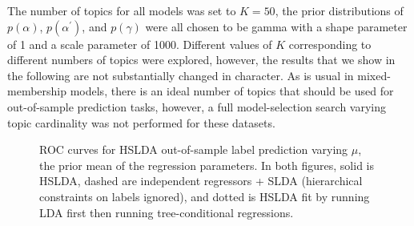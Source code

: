 The number of topics for all models was set to $K=50$, the prior distributions of
$p\left(\alpha\right)$, $p\left(\alpha^{\prime}\right)$, and
$p\left(\gamma\right)$ were all chosen to be gamma with a shape parameter of 1 and a
scale parameter of 1000.   Different values of $K$ corresponding to different numbers of topics were explored, however, the results that we show in the following are not substantially changed in character.  As is usual in mixed-membership models, there is an ideal number of topics that should be used for out-of-sample prediction tasks, however, a full model-selection search varying topic cardinality was not performed for these datasets.

\begin{figure}[h]
\begin{center}
\caption{ROC curves for HSLDA out-of-sample label prediction varying $\mu$, the prior mean of the regression parameters. 
In both figures, solid is HSLDA, dashed are independent regressors + SLDA (hierarchical 
constraints on labels ignored), and dotted is HSLDA fit by running LDA first then running 
tree-conditional regressions.}
\end{center}
\end{figure}


